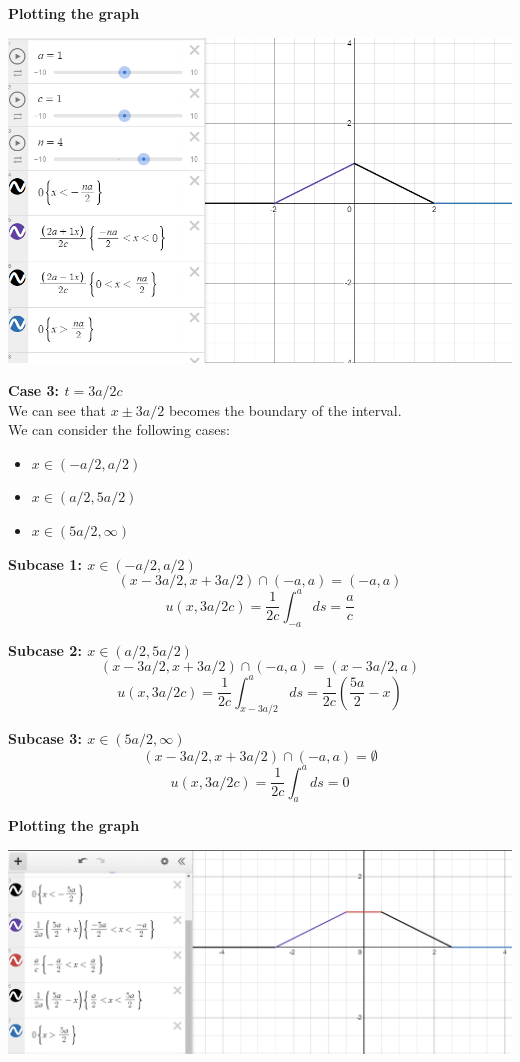 \documentclass[answers,12pt,addpoints]{exam}
\begin{document}
\begin{questions}
\textbf{Plotting the graph}\\
\begin{center}
    \includegraphics[scale = 0.5]{HW3IMG/12.png}
\end{center}

\textbf{Case 3: $t = 3a/2c$}\\
We can see that $x \pm 3a/2$ becomes the boundary of the interval. \\
We can consider the following cases:
\begin{itemize}
    \item $ x \in (-a/2, a/2)$
    \item $ x \in (a/2, 5a/2)$
    \item $ x \in (5a/2, \infty)$
\end{itemize}
\textbf{Subcase 1: $x \in (-a/2, a/2)$}\\
$$(x-3a/2, x+3a/2) \cap (-a,a) = (-a,a)$$
$$u(x,3a/2c) = \frac{1}{2c} \int_{-a}^{a} ds = \frac{a}{c}$$

\textbf{Subcase 2: $x \in (a/2, 5a/2)$}\\
$$(x-3a/2, x+3a/2) \cap (-a,a) = (x-3a/2, a)$$
$$u(x,3a/2c) = \frac{1}{2c} \int_{x-3a/2}^{a} ds = \frac{1}{2c}(\frac{5a}{2}-x)$$

\textbf{Subcase 3: $x \in (5a/2, \infty)$}\\
$$(x-3a/2, x+3a/2) \cap (-a,a) = \emptyset$$
$$u(x,3a/2c) = \frac{1}{2c} \int_{a}^{a} ds = 0$$

\textbf{Plotting the graph}\\

\begin{center}
    \includegraphics[scale = 0.5]{HW3IMG/13.png}
\end{center}



\end{questions}
\end{document}
